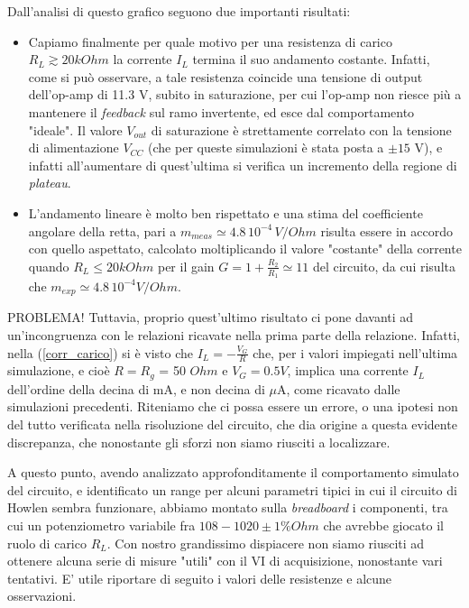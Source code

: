 \documentclass[journal, a4paper]{IEEEtran}
\begin{document}
Dall'analisi di questo grafico seguono due importanti risultati:

\begin{itemize}
\item Capiamo finalmente per quale motivo per una resistenza di carico $R_L \gtrsim 20k\si{Ohm}$ la corrente $I_L$ termina il suo andamento costante. Infatti, come si può osservare, a tale resistenza coincide una tensione di output dell'op-amp di 11.3 V, subito in saturazione, per cui l'op-amp non riesce più a mantenere il \textit{feedback} sul ramo invertente, ed esce dal comportamento "ideale". Il valore $V_{out}$ di saturazione è strettamente correlato con la tensione di alimentazione $V_{CC}$ (che per queste simulazioni è stata posta a $\pm 15$ V), e infatti all'aumentare di quest'ultima si verifica un incremento della regione di \textit{plateau}.

\item L'andamento lineare è molto ben rispettato e una stima del coefficiente angolare della retta, pari a $m_{meas} \simeq 4.8 \, 10^{-4} \, \si{V/ Ohm}$ risulta essere in accordo con quello aspettato, calcolato moltiplicando il valore "costante" della corrente quando $R_L \leq 20k\si{Ohm}$ per il gain $G = 1 + \frac{R_2}{R_1} \simeq 11$ del circuito, da cui risulta che $ m_{exp} \simeq 4.8 \, 10^{-4} \si{V/ Ohm}$.\\
\end{itemize} 

\textsc{PROBLEMA!}
Tuttavia, proprio quest'ultimo risultato ci pone davanti ad un'incongruenza con le relazioni ricavate nella prima parte della relazione. Infatti, nella (\ref{corr_carico}) si è visto che $I_L = - \frac{V_G}{R}$ che, per i valori impiegati nell'ultima simulazione, e cioè $R = R_g$ = 50 $\si{Ohm}$ e $V_G = 0.5V$, implica una corrente $I_L$ dell'ordine della decina di mA, e non decina di $\mu$A, come ricavato dalle simulazioni precedenti. Riteniamo che ci possa essere un errore, o una ipotesi non del tutto verificata nella risoluzione del circuito, che dia origine a questa evidente discrepanza, che nonostante gli sforzi non siamo riusciti a localizzare.


A questo punto, avendo analizzato approfonditamente il comportamento simulato del circuito, e identificato un range per alcuni parametri tipici in cui il circuito di Howlen sembra funzionare, abbiamo montato sulla \textit{breadboard} i componenti, tra cui un potenziometro variabile fra $108-1020 \pm 1\% \si{Ohm}$ che avrebbe giocato il ruolo di carico $R_L$. Con nostro grandissimo dispiacere non siamo riusciti ad ottenere alcuna serie di misure "utili" con il VI di acquisizione, nonostante vari tentativi. E' utile riportare di seguito i valori delle resistenze e alcune osservazioni.\\
 
\end{document}
